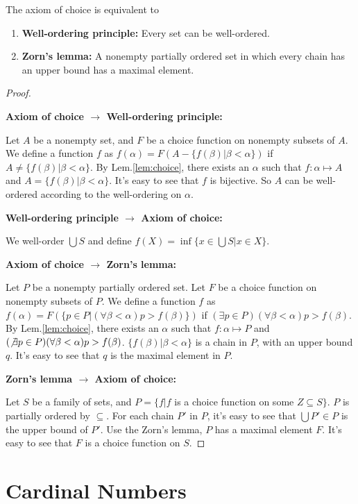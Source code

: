 \documentclass[12pt]{book}
\begin{document}
\begin{theorem}
	The axiom of choice is equivalent to
	\begin{enumerate}
		\item[] {\bf Well-ordering principle:} Every set can be well-ordered.
		\item[] {\bf Zorn's lemma:} A nonempty partially ordered set in which every chain has an upper bound has a maximal element.
	\end{enumerate}
\end{theorem}
\begin{proof}
	\

	{\bf Axiom of choice $\rightarrow$ Well-ordering principle:}

	Let $A$ be a nonempty set, and $F$ be a choice function on nonempty subsets of $A$. We define a function $f$ as $f(\alpha)=F(A-\{f(\beta)|\beta<\alpha\})$ if $A\neq \{f(\beta)|\beta<\alpha\}$. By Lem.\ref{lem:choice}, there exists an $\alpha$ such that $f:\alpha\mapsto A$ and $A=\{f(\beta)|\beta<\alpha\}$. It's easy to see that $f$ is bijective. So $A$ can be well-ordered according to the well-ordering on $\alpha$.

	{\bf Well-ordering principle $\rightarrow$ Axiom of choice:}

	We well-order $\bigcup S$ and define $f(X)=\inf\{x\in\bigcup S|x\in X\}$.

	{\bf Axiom of choice $\rightarrow$ Zorn's lemma:}
	
	Let $P$ be a nonempty partially ordered set. Let $F$ be a choice function on nonempty subsets of $P$. We define a function $f$ as $f(\alpha)=F(\{p\in P|(\forall\beta<\alpha)p>f(\beta)\})$ if $(\exists p\in P)(\forall\beta<\alpha)p>f(\beta)$. By Lem.\ref{lem:choice}, there exists an $\alpha$ such that $f:\alpha\mapsto P$ and $(\not\exists p\in P)(\forall\beta<\alpha)p>f(\beta)$. $\{f(\beta)|\beta<\alpha\}$ is a chain in $P$, with an upper bound $q$. It's easy to see that $q$ is the maximal element in $P$.

	{\bf Zorn's lemma $\rightarrow$ Axiom of choice:}
	
	Let $S$ be a family of sets, and $P=\{f| f$ is a choice function on some $Z\subseteq S\}$. $P$ is partially ordered by $\subseteq$. For each chain $P'$ in $P$, it's easy to see that $\bigcup P'\in P$ is the upper bound of $P'$. Use the Zorn's lemma, $P$ has a maximal element $F$. It's easy to see that $F$ is a choice function on $S$.
\end{proof}

\chapter{Cardinal Numbers}
\end{document}
